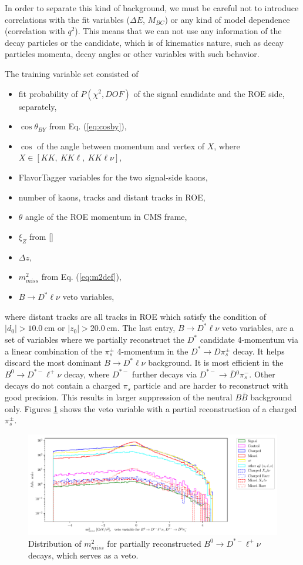 \documentclass[  headings=standardclasses,
  headings=big,oneside,a4paper,openany,12pt]{scrbook}
\newcommand {\e}[1]{\mathrm{~#1}}
\begin{document}
In order to separate this kind of background, we must be careful not to introduce correlations with the fit variables ($\Delta E$, $M_{BC}$) or any kind of model dependence (correlation with $q^2$). This means that we can not use any information of the decay particles or the candidate, which is of kinematics nature, such as decay particles momenta, decay angles or other variables with such behavior.

The training variable set consisted of
\begin{itemize}
\item fit probability of $P(\chi^2,DOF)$ of the signal candidate and the ROE side, separately,
\item $\cos\theta_{BY}$ from Eq. (\ref{eq:cosby}),
\item $\cos$ of the angle between momentum and vertex of $X$, where $X \in [KK,~KK\ell,~KK\ell\nu]$,
\item FlavorTagger variables for the two signal-side kaons,
\item number of kaons, tracks and distant tracks in ROE,
\item $\theta$ angle of the ROE momentum in CMS frame,
\item $\xi_Z$ from []
\item $\Delta z$,
\item $m_{miss}^2$ from Eq. (\ref{eq:m2def}),
\item $B \to D^* \ell \nu$ veto variables,
\end{itemize}
where distant tracks are all tracks in ROE which satisfy the condition of $\vert d_0 \vert  > 10.0\e{cm}$ or $\vert z_0 \vert > 20.0\e{cm}$. The last entry, $B \to D^* \ell \nu$ veto variables, are a set of variables where we partially reconstruct the $D^*$ candidate 4-momentum via a linear combination of the $\pi^\pm_s$ 4-momentum in the $D^* \to D \pi_s^\pm$ decay. It helps discard the most dominant $B \to D^* \ell \nu$ background. It is most efficient in the $B^0 \to D^{*-} \ell^+ \nu$ decay, where $D^{*-}$ further decays via $D^{*-} \to \bar D {}^0 \pi^-_s$. Other decays do not contain a charged $\pi_s$ particle and are harder to reconstruct with good precision. This results in larger suppression of the neutral $B \bar B$ background only. Figures \ref{fig:vetoplot} shows the veto variable with a partial reconstruction of a charged $\pi_s^\pm$.

\begin{figure}[H]
\centering
\captionsetup{width=0.8\linewidth}
\includegraphics[width=\linewidth]{fig/bb_partial_veto}
\caption{Distribution of $m_{miss}^2$ for partially reconstructed $B^0 \to D^{*-} \ell^+ \nu$ decays, which serves as a veto.}
\label{fig:vetoplot}
\end{figure}
\end{document}

